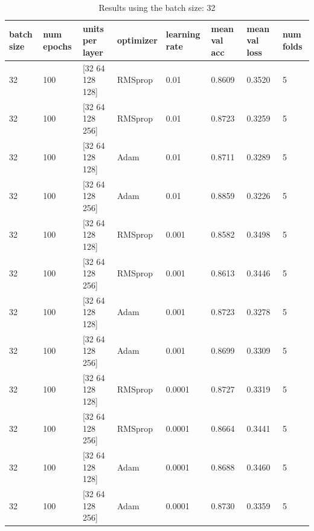 \documentclass{book}
\begin{document}
            \begin{table}
                \begin{center}
                    \begin{tabular}{m{1cm}m{1cm}m{2.5cm}m{1.3cm}m{1cm}m{2cm}m{2cm}m{1cm}}
                        \midrule
                        batch size	& num epochs	& units per layer	& optimizer	& learning rate	& mean val acc	& mean val loss	& num folds \\
                        \midrule
                        32	& 100	& [32  64  128  128]	& RMSprop	& 0.01	& 0.8609 & 0.3520 & 5 \\
                        \midrule
                        32	& 100	& [32  64  128  256]	& RMSprop	& 0.01	& 0.8723 & 0.3259 & 5 \\
                        \midrule
                        32	& 100	& [32  64  128  128]	& Adam	& 0.01	& 0.8711 & 0.3289 & 5 \\
                        \midrule
                        32	& 100	& [32  64  128  256]	& Adam	& 0.01	& 0.8859 & 0.3226 & 5 \\
                        \midrule
                        32	& 100	& [32  64  128  128]	& RMSprop	& 0.001	& 0.8582 & 0.3498 & 5 \\
                        \midrule
                        32	& 100	& [32  64  128  256]	& RMSprop	& 0.001	& 0.8613 & 0.3446 & 5 \\
                        \midrule
                        32	& 100	& [32  64  128  128]	& Adam	& 0.001	& 0.8723 & 0.3278 & 5 \\
                        \midrule
                        32	& 100	& [32  64  128  256]	& Adam	& 0.001	& 0.8699 & 0.3309 & 5 \\
                        \midrule
                        32	& 100	& [32  64  128  128]	& RMSprop	& 0.0001	& 0.8727 & 0.3319 & 5 \\
                        \midrule
                        32	& 100	& [32  64  128  256]	& RMSprop	& 0.0001	& 0.8664 & 0.3441 & 5 \\
                        \midrule
                        32	& 100	& [32  64  128  128]	& Adam	& 0.0001	& 0.8688 & 0.3460 & 5 \\
                        \midrule
                        32	& 100	& [32  64  128  256]	& Adam	& 0.0001	& 0.8730 & 0.3359 & 5 \\
                        \midrule
                    \end{tabular}
                \end{center}
                \caption{\label{tab:results}Results using the batch size: 32}
            \end{table}
\end{document}
